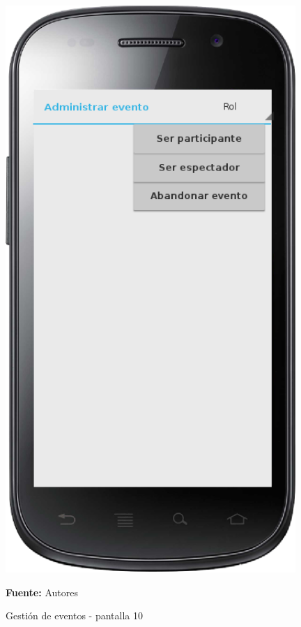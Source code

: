 \begin{figure}[!htb]
  \begin{center}
    \includegraphics[width=11cm]{./imagenes/UI/Eventos/gestion_eventos_10.png}
    \caption{Gestión de eventos - pantalla 10}
    \label{fig:gestion_eventos_10}
    \textbf{Fuente:}  Autores
  \end{center}
\end{figure}